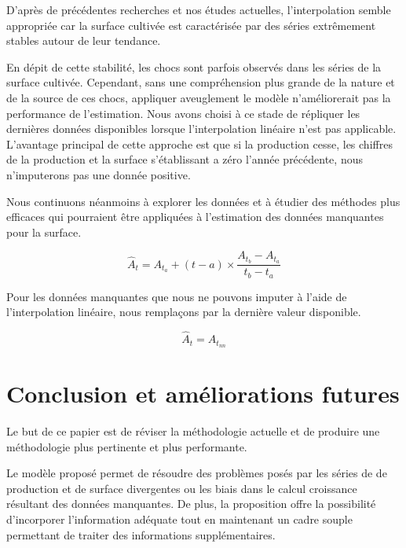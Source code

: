 \documentclass[nojss]{jss}\usepackage{graphicx, color}
\begin{document}
D'apr\`{e}s de pr\'{e}c\'{e}dentes recherches et nos \'{e}tudes
actuelles, l'interpolation semble appropri\'{e}e car la surface
cultiv\'{e}e est caract\'{e}ris\'{e}e par des s\'{e}ries extr\^{e}mement
stables autour de leur tendance.


En d\'{e}pit de cette stabilit\'{e}, les chocs sont parfois
observ\'{e}s dans les s\'{e}ries de la surface cultiv\'{e}e.
Cependant, sans une compr\'{e}hension plus grande de la nature et de
la source de ces chocs, appliquer aveuglement le mod\`{e}le
n'am\'{e}liorerait pas la performance de l'estimation. Nous avons
choisi \`{a} ce stade de r\'{e}pliquer les derni\`{e}res donn\'{e}es
disponibles lorsque l'interpolation lin\'{e}aire n'est pas
applicable. L'avantage principal de cette approche est que si la
production cesse, les chiffres de la production et la surface
s'\'{e}tablissant a z\'{e}ro l'ann\'{e}e pr\'{e}c\'{e}dente, nous
n'imputerons pas une donn\'{e}e positive.

Nous continuons n\'{e}anmoins \`{a} explorer les donn\'{e}es et \`{a}
\'{e}tudier des m\'{e}thodes plus efficaces qui pourraient \^{e}tre
appliqu\'{e}es \`{a} l'estimation des donn\'{e}es manquantes pour la
surface.

\begin{equation}
  \label{eq:linearInterpolation}
  \hat{A}_t = A_{t_a} + (t - a) \times \frac{A_{t_b} - A_{t_a}}{t_b - t_a}
\end{equation}

Pour les donn\'{e}es manquantes que nous ne pouvons imputer \`{a}
l'aide de l'interpolation lin\'{e}aire, nous rempla\c{c}ons par la
derni\`{e}re valeur disponible.

\begin{equation}
  \label{eq:locf}
  \hat{A}_t = A_{t_{nn}}
\end{equation}


\section{Conclusion et am\'{e}liorations futures}

Le but de ce papier est de r\'{e}viser la m\'{e}thodologie actuelle et
de produire une m\'{e}thodologie plus pertinente et plus performante.


Le mod\`{e}le propos\'{e} permet de r\'{e}soudre des probl\`{e}mes
pos\'{e}s par les s\'{e}ries de de production et de
surface divergentes ou les biais dans le calcul croissance
r\'{e}sultant des donn\'{e}es manquantes. De plus, la proposition
offre la possibilit\'{e} d'incorporer l'information ad\'{e}quate tout
en maintenant un cadre souple permettant de traiter des informations
suppl\'{e}mentaires.
\end{document}
